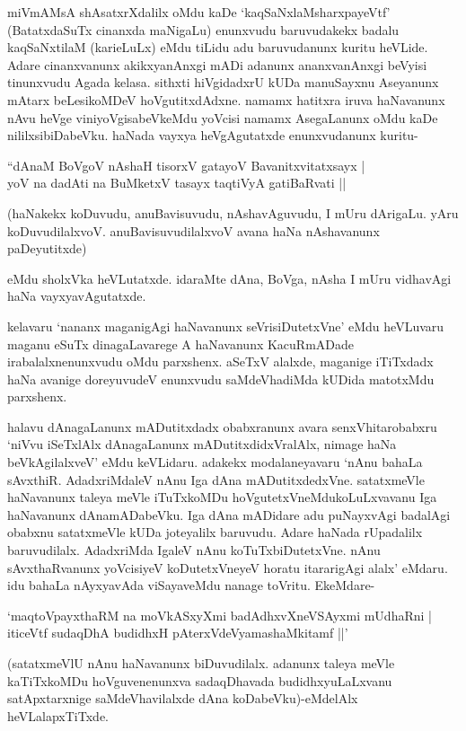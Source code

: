 miVmAMsA shAsatxrXdalilx oMdu kaDe `kaqSaNxlaMsharxpayeVtf' (BatatxdaSuTx cinanxda maNigaLu) enunxvudu baruvudakekx badalu kaqSaNxtilaM (karieLuLx) eMdu tiLidu adu baruvudanunx kuritu heVLide. Adare cinanxvanunx akikxyanAnxgi mADi adanunx ananxvanAnxgi beVyisi tinunxvudu Agada kelasa. sithxti hiVgidadxrU kUDa manuSayxnu Aseyanunx mAtarx beLesikoMDeV hoVgutitxdAdxne. namamx hatitxra iruva haNavanunx nAvu heVge viniyoVgisabeVkeMdu yoVcisi namamx AsegaLanunx oMdu kaDe nililxsibiDabeVku. haNada vayxya heVgAgutatxde enunxvudanunx kuritu-

\begin{shloka}
``dAnaM BoVgoV nAshaH tisorxV gatayoV Bavanitxvitatxsayx |\\
yoV na dadAti na BuMketxV tasayx taqtiVyA gatiBaRvati ||
\end{shloka}

(haNakekx koDuvudu, anuBavisuvudu, nAshavAguvudu, I mUru dArigaLu. yAru koDuvudilalxvoV. anuBavisuvudilalxvoV avana haNa nAshavanunx paDeyutitxde)

eMdu sholxVka heVLutatxde. idaraMte dAna, BoVga, nAsha I mUru vidhavAgi haNa vayxyavAgutatxde.

kelavaru `nananx maganigAgi haNavanunx seVrisiDutetxVne' eMdu heVLuvaru maganu eSuTx dinagaLavarege A haNavanunx KacuRmADade irabalalxnenunxvudu oMdu parxshenx. aSeTxV alalxde, maganige iTiTxdadx haNa avanige doreyuvudeV enunxvudu saMdeVhadiMda kUDida matotxMdu parxshenx.

halavu dAnagaLanunx mADutitxdadx obabxranunx avara senxVhitarobabxru `niVvu iSeTxlAlx dAnagaLanunx mADutitxdidxVralAlx, nimage haNa beVkAgilalxveV' eMdu keVLidaru. adakekx modalaneyavaru `nAnu bahaLa sAvxthiR. AdadxriMdaleV nAnu Iga dAna mADutitxdedxVne. satatxmeVle haNavanunx taleya meVle iTuTxkoMDu hoVgutetxVneMdukoLuLxvavanu Iga haNavanunx dAnamADabeVku. Iga dAna mADidare adu puNayxvAgi badalAgi obabxnu satatxmeVle kUDa joteyalilx baruvudu. Adare haNada rUpadalilx baruvudilalx. AdadxriMda IgaleV nAnu koTuTxbiDutetxVne. nAnu sAvxthaRvanunx yoVcisiyeV koDutetxVneyeV horatu itararigAgi alalx' eMdaru. idu bahaLa nAyxyavAda viSayaveMdu nanage toVritu. EkeMdare-

\begin{shloka}
`maqtoVpayxthaRM na moVkASxyXmi badAdhxvXneVSAyxmi mUdhaRni |\\
iticeVtf sudaqDhA budidhxH pAterxVdeVyamashaMkitamf ||'
\end{shloka}

(satatxmeVlU nAnu haNavanunx biDuvudilalx. adanunx taleya meVle kaTiTxkoMDu hoVguvenenunxva sadaqDhavada budidhxyuLaLxvanu satApxtarxnige saMdeVhavilalxde dAna koDabeVku)-eMdelAlx heVLalapxTiTxde.


